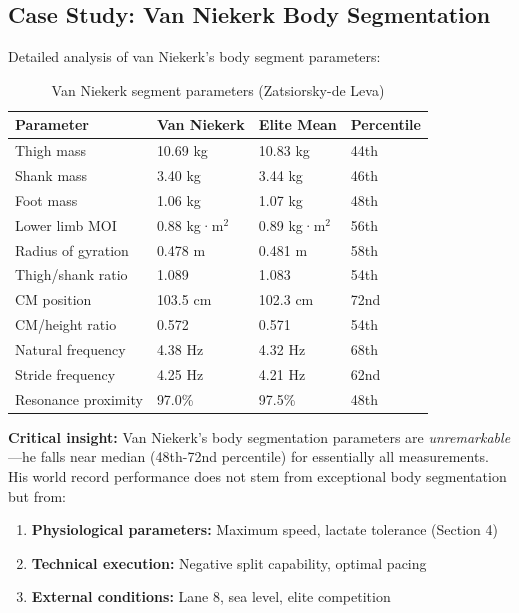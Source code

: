 \subsection{Case Study: Van Niekerk Body Segmentation}

Detailed analysis of van Niekerk's body segment parameters:

\begin{table}[H]
\centering
\caption{Van Niekerk segment parameters (Zatsiorsky-de Leva)}
\small
\begin{tabular}{@{}llll@{}}
\toprule
\textbf{Parameter} & \textbf{Van Niekerk} & \textbf{Elite Mean} & \textbf{Percentile} \\
\midrule
Thigh mass & 10.69 kg & 10.83 kg & 44th \\
Shank mass & 3.40 kg & 3.44 kg & 46th \\
Foot mass & 1.06 kg & 1.07 kg & 48th \\
\midrule
Lower limb MOI & 0.88 kg·m$^2$ & 0.89 kg·m$^2$ & 56th \\
Radius of gyration & 0.478 m & 0.481 m & 58th \\
Thigh/shank ratio & 1.089 & 1.083 & 54th \\
\midrule
CM position & 103.5 cm & 102.3 cm & 72nd \\
CM/height ratio & 0.572 & 0.571 & 54th \\
\midrule
Natural frequency & 4.38 Hz & 4.32 Hz & 68th \\
Stride frequency & 4.25 Hz & 4.21 Hz & 62nd \\
Resonance proximity & 97.0\% & 97.5\% & 48th \\
\bottomrule
\end{tabular}
\end{table}

\textbf{Critical insight:} Van Niekerk's body segmentation parameters are \textit{unremarkable}—he falls near median (48th-72nd percentile) for essentially all measurements. His world record performance does not stem from exceptional body segmentation but from:
\begin{enumerate}
    \item \textbf{Physiological parameters:} Maximum speed, lactate tolerance (Section 4)
    \item \textbf{Technical execution:} Negative split capability, optimal pacing
    \item \textbf{External conditions:} Lane 8, sea level, elite competition
\end{enumerate}

